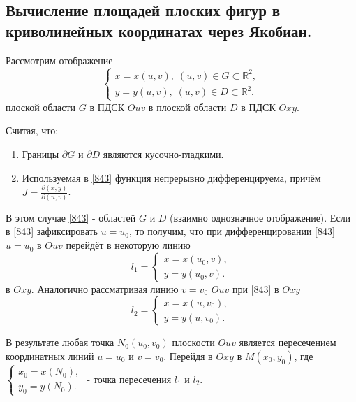 \subsection{Вычисление площадей плоских фигур в криволинейных координатах через Якобиан.}

Рассмотрим отображение
\begin{equation}
\label{843}
\begin{cases}
x = x(u,v), \; (u, v) \in G \subset \mathbb{R}^2, \\
y = y(u,v), \; (u, v) \in D \subset \mathbb{R}^2.
\end{cases}
\end{equation}
плоской области $G$ в ПДСК $Ouv$ в плоской области $D$ в ПДСК $Oxy$.

Считая, что:
\begin{enumerate}
	\item Границы $\partial G$ и $\partial D$ являются кусочно-гладкими.
	\item Используемая в \eqref{843} функция непрерывно дифференцируема, причём $J = \frac{\partial (x,y)}{\partial (u,v)}$.
\end{enumerate}

В этом случае \eqref{843} -  областей $G$ и $D$ (взаимно однозначное отображение). Если в \eqref{843} зафиксировать $u = u_0$, то получим, что при дифференцировании \eqref{843} $u = u_0$ в $Ouv$ перейдёт в некоторую линию 
\begin{equation*}
l_1 = \begin{cases}
x = x(u_0, v),\\
y = y(u_0, v).
\end{cases}
\end{equation*}
в $Oxy$. Аналогично рассматривая линию $v = v_0$ $Ouv$ при \eqref{843} в $Oxy$
\begin{equation*}
l_2 = \begin{cases}
x = x(u, v_0),\\
y = y(u, v_0).
\end{cases}
\end{equation*}

В результате любая точка $N_0(u_0, v_0)$ плоскости $Ouv$ является пересечением координатных линий $u = u_0$ и $v = v_0$. Перейдя в $Oxy$ в $M(x_0, y_0)$, где
$\begin{cases}
x_0 = x(N_0),\\
y_0 = y(N_0).
\end{cases}$ - точка пересечения $l_1$ и $l_2$.


